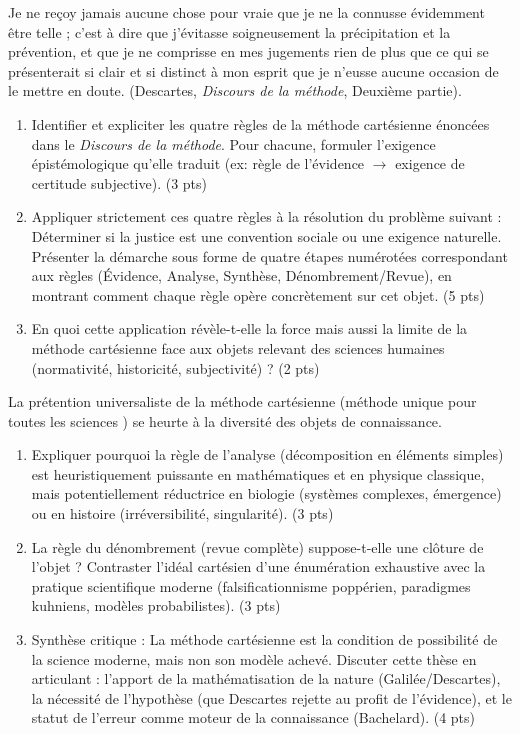 \documentclass[11pt]{article}
\begin{document}
\begin{exercice}
\og Je ne reçoy jamais aucune chose pour vraie que je ne la connusse évidemment être telle ; c'est à dire que j'évitasse soigneusement la précipitation et la prévention, et que je ne comprisse en mes jugements rien de plus que ce qui se présenterait si clair et si distinct à mon esprit que je n'eusse aucune occasion de le mettre en doute. \fg{} (Descartes, \textit{Discours de la méthode}, Deuxième partie).
\begin{enumerate}
    \item Identifier et expliciter les quatre règles de la méthode cartésienne énoncées dans le \textit{Discours de la méthode}. Pour chacune, formuler l'exigence épistémologique qu'elle traduit (ex: règle de l'évidence $\rightarrow$ exigence de certitude subjective). (3 pts)
    \item Appliquer strictement ces quatre règles à la résolution du problème suivant : \og Déterminer si la justice est une convention sociale ou une exigence naturelle. \fg{} 
    Présenter la démarche sous forme de quatre étapes numérotées correspondant aux règles (Évidence, Analyse, Synthèse, Dénombrement/Revue), en montrant comment chaque règle opère concrètement sur cet objet. (5 pts)
    \item En quoi cette application révèle-t-elle la force mais aussi la limite de la méthode cartésienne face aux objets relevant des sciences humaines (normativité, historicité, subjectivité) ? (2 pts)
\end{enumerate}
\end{exercice}

\begin{exercice}
La prétention universaliste de la méthode cartésienne (\og méthode unique pour toutes les sciences \fg{}) se heurte à la diversité des objets de connaissance.
\begin{enumerate}
    \item Expliquer pourquoi la règle de l'\og analyse \fg{} (décomposition en éléments simples) est heuristiquement puissante en mathématiques et en physique classique, mais potentiellement réductrice en biologie (systèmes complexes, émergence) ou en histoire (irréversibilité, singularité). (3 pts)
    \item La règle du \og dénombrement \fg{} (revue complète) suppose-t-elle une clôture de l'objet ? Contraster l'idéal cartésien d'une \og énumération exhaustive \fg{} avec la pratique scientifique moderne (falsificationnisme poppérien, paradigmes kuhniens, modèles probabilistes). (3 pts)
    \item Synthèse critique : \og La méthode cartésienne est la condition de possibilité de la science moderne, mais non son modèle achevé. \fg{} Discuter cette thèse en articulant : l'apport de la mathématisation de la nature (Galilée/Descartes), la nécessité de l'hypothèse (que Descartes rejette au profit de l'évidence), et le statut de l'erreur comme moteur de la connaissance (Bachelard). (4 pts)
\end{enumerate}
\end{exercice}
\end{document}
